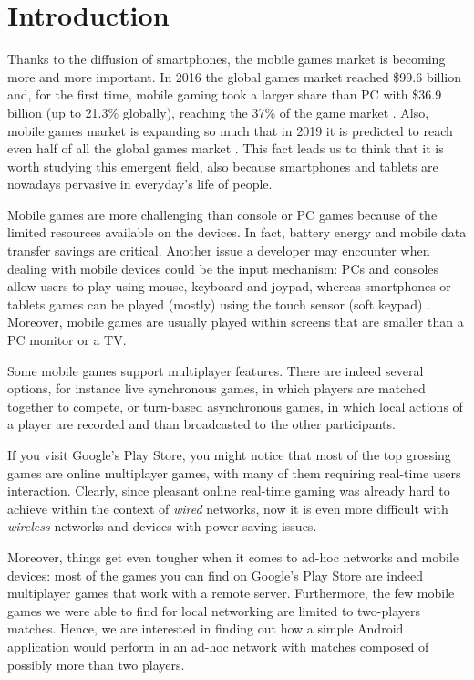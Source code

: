 \section{Introduction}
Thanks to the diffusion of smartphones, the mobile games market is becoming
more and more important. In 2016 the global games market reached \$99.6
billion and, for the first time, mobile gaming took a larger share than PC
with \$36.9 billion (up to 21.3\% globally), reaching the 37\% of the game
market \cite{bib:newzoo2}. Also, mobile games market is expanding so much that
in 2019 it is predicted to reach even half of all the global games market
\cite{bib:newzoo}. This fact leads us to think that it is worth studying
this emergent field, also because smartphones and tablets are nowadays
pervasive in everyday's life of people.

Mobile games are more challenging than console or PC games because of the
limited resources available on the devices. In fact, battery energy and
mobile data transfer savings are critical. Another issue a developer may
encounter when dealing with mobile devices could be the input mechanism:
PCs and consoles allow users to play using mouse, keyboard and joypad,
whereas smartphones or tablets games can be played (mostly) using the
touch sensor (soft keypad) \cite{bib:mobile-input-devices}. Moreover, mobile
games are usually played within screens that are smaller than a PC monitor or a
TV.

Some mobile games support multiplayer features. There are indeed several
options, for instance live synchronous games, in which players are matched
together to compete, or turn-based asynchronous games, in which local actions
of a player are recorded and than broadcasted to the other participants.

If you visit Google's Play Store, you might notice that most of the top
grossing games are online multiplayer games, with many of them requiring
real-time users interaction. Clearly, since pleasant online real-time gaming
was already hard to achieve within the context of \textit{wired} networks, now
it is even more difficult with \textit{wireless} networks and devices with
power saving issues.

Moreover, things get even tougher when it comes to ad-hoc networks and mobile
devices: most of the games you can find on Google's Play Store are indeed
multiplayer games that work with a remote server. Furthermore, the few mobile
games we were able to find for local networking are limited to two-players
matches. Hence, we are interested in finding out how a simple Android
application would perform in an ad-hoc network with matches composed of
possibly more than two players.

